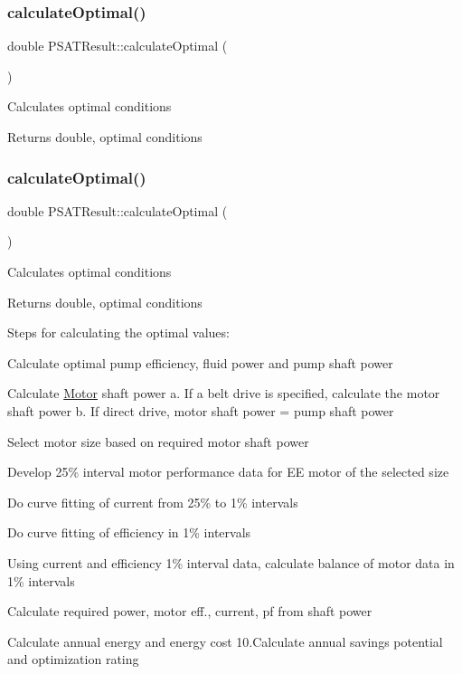 \subsubsection{\texorpdfstring{calculate\+Optimal()}{calculateOptimal()}\hspace{0.1cm}{\footnotesize\ttfamily [1/3]}}
{\footnotesize\ttfamily double P\+S\+A\+T\+Result\+::calculate\+Optimal (\begin{DoxyParamCaption}{ }\end{DoxyParamCaption})}

Calculates optimal conditions \begin{DoxyReturn}{Returns}
double, optimal conditions 
\end{DoxyReturn}
\mbox{\label{class_p_s_a_t_result_a25d50cd89b326f18449496a56d54f472}} 
\subsubsection{\texorpdfstring{calculate\+Optimal()}{calculateOptimal()}\hspace{0.1cm}{\footnotesize\ttfamily [2/3]}}
{\footnotesize\ttfamily double P\+S\+A\+T\+Result\+::calculate\+Optimal (\begin{DoxyParamCaption}{ }\end{DoxyParamCaption})}

Calculates optimal conditions \begin{DoxyReturn}{Returns}
double, optimal conditions 
\end{DoxyReturn}
Steps for calculating the optimal values\+:
\begin{DoxyEnumerate}
\item Calculate optimal pump efficiency, fluid power and pump shaft power
\item Calculate \hyperlink{class_motor}{Motor} shaft power a. If a belt drive is specified, calculate the motor shaft power b. If direct drive, motor shaft power = pump shaft power
\item Select motor size based on required motor shaft power
\item Develop 25\% interval motor performance data for EE motor of the selected size
\item Do curve fitting of current from 25\% to 1\% intervals
\item Do curve fitting of efficiency in 1\% intervals
\item Using current and efficiency 1\% interval data, calculate balance of motor data in 1\% intervals
\item Calculate required power, motor eff., current, pf from shaft power
\item Calculate annual energy and energy cost 10.\+Calculate annual savings potential and optimization rating
\end{DoxyEnumerate}

